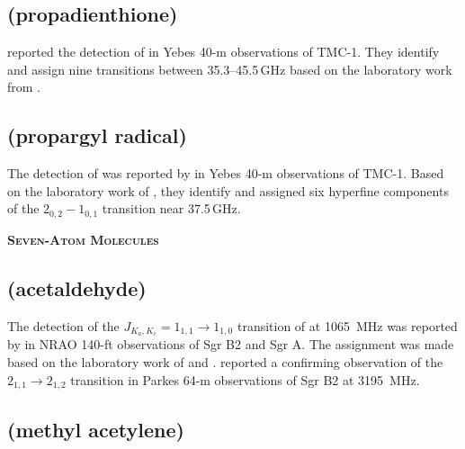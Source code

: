 \documentclass[twocolumn]{aastex631}
\newcommand{\update}[1]{{#1}}
\begin{document}
	\subsection{\update{ (propadienthione)}}
	\label{H2CCCS}
	
	\update{\citet{Cernicharo:2021ke} reported the detection of \ce{H2CCCS} in Yebes 40-m observations of TMC-1.  They identify and assign nine transitions between 35.3--45.5\,GHz based on the laboratory work from \citet{Brown:1988ie}.}
	
	\subsection{\update{ (propargyl radical)}}
	\label{CH2CCH}
	
	\update{The detection of  was reported by \citet{2021A&A...647L..10A} in Yebes 40-m observations of TMC-1.  Based on the laboratory work of \citet{1997JChPh.107.2728T}, they identify and assigned six hyperfine components of the $2_{0,2} - 1_{0,1}$ transition near 37.5\,GHz.}
	
    
    \begin{center}
        \large
        \textsc{\textbf{Seven-Atom Molecules}}
        \label{7atoms}
        \normalsize
    \end{center}        
	
	\subsection{ (acetaldehyde)}
	\label{CH3CHO}
	
	The detection of the $J_{K_a,K_c} = 1_{1,1}\rightarrow1_{1,0}$ transition of  at 1065~MHz was reported by \citet{Gottlieb:1973vc} in NRAO 140-ft observations of Sgr B2 and Sgr A.  The assignment was made based on the laboratory work of \citet{Kilb:1957bv} and \citet{Souter:1970bc}.  \citet{Fourikis:1974et} reported a confirming observation of the $2_{1,1}\rightarrow2_{1,2}$ transition in Parkes 64-m observations of Sgr B2 at 3195~MHz.
	
	\subsection{ (methyl acetylene)}
	\label{CH3CCH}
	
\end{document}
